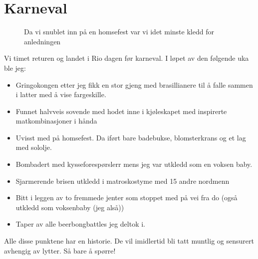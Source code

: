 \section*{Karneval}

\begin{figure}[H]
	\centering

\noindent{}
	\caption*{Da vi snublet inn på en homsefest var vi idet minste
	kledd for anledningen}
	\label{fig:homsebloko}
\end{figure}


Vi timet returen og landet i Rio dagen før karneval. I løpet av den
følgende uka ble jeg:

\begin{itemize}
	\item  Gringokongen  etter jeg fikk  en stor gjeng med brasillianere til å falle
		sammen i latter med å vise fargeskille.
	\item Funnet halvveis sovende med hodet inne i kjøleskapet med
		inspirerte matkombinasjoner i hånda
	\item   Uvisst med på homsefest. Da iført bare badebukse, blomsterkrans og et lag med sololje.
	\item Bombadert med kysseforespørslerr mens jeg var utkledd
		som en voksen baby.
	\item Sjarmerende brisen utkledd i matroskostyme med 15 andre
		nordmenn
	\item  Bitt i leggen av to fremmede jenter som stoppet
		med på vei fra do (også utkledd som voksenbaby (jeg
		alså))
	\item Taper av alle beerbongbattles jeg deltok i.
	
\end{itemize}

Alle disse punktene har en historie. De vil imidlertid bli tatt
muntlig og sensurert avhengig av lytter. Så bare å spørre!

